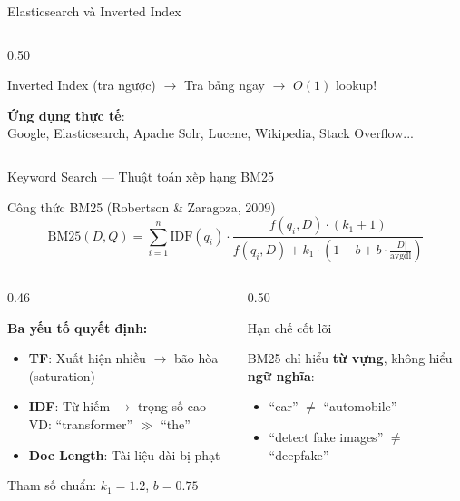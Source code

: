 \begin{frame}{Elasticsearch và Inverted Index}
\begin{columns}[T]
\begin{column}{0.50\textwidth}
\begin{exampleblock}{Inverted Index (tra ngược)}
\vspace{0.1cm}
{\small\textcolor{accentTeal}{$\to$ Tra bảng ngay $\to$ $O(1)$ lookup!}}
\end{exampleblock}

\vspace{0.1cm}
{\footnotesize
\textbf{Ứng dụng thực tế}:\\
Google, Elasticsearch, Apache Solr, Lucene, Wikipedia, Stack Overflow...
}

\end{column}
\end{columns}
\end{frame}

\begin{frame}{Keyword Search --- Thuật toán xếp hạng BM25}

\begin{block}{Công thức BM25 {\scriptsize (Robertson \& Zaragoza, 2009)}}
\vspace{-0.1cm}
\[
\text{BM25}(D, Q) = \sum_{i=1}^{n} \text{IDF}(q_i) \cdot \frac{f(q_i, D) \cdot (k_1 + 1)}{f(q_i, D) + k_1 \cdot \left(1 - b + b \cdot \frac{|D|}{\text{avgdl}}\right)}
\]
\vspace{-0.1cm}
\end{block}

\begin{columns}[T]
\begin{column}{0.46\textwidth}
{\small
\textbf{Ba yếu tố quyết định:}
\begin{itemize}\itemsep0pt \parskip0pt 
    \item \textcolor{accentBlue}{\textbf{TF}}: Xuất hiện nhiều $\to$ bão hòa (saturation)
    \item \textcolor{accentOrange}{\textbf{IDF}}: Từ hiếm $\to$ trọng số cao\\VD: ``transformer'' $\gg$ ``the''
    \item \textcolor{accentPurple}{\textbf{Doc Length}}: Tài liệu dài bị phạt
\end{itemize}
Tham số chuẩn: $k_1 = 1.2$, $b = 0.75$
}
\end{column}
\begin{column}{0.50\textwidth}

\begin{alertblock}{Hạn chế cốt lõi}
{\small BM25 chỉ hiểu \textbf{từ vựng}, không hiểu \textbf{ngữ nghĩa}:
\begin{itemize}\itemsep0pt \parskip0pt 
    \item ``car'' $\neq$ ``automobile''
    \item ``detect fake images'' $\neq$ ``deepfake''
\end{itemize}
}
\end{alertblock}


\end{column}
\end{columns}
\end{frame}
